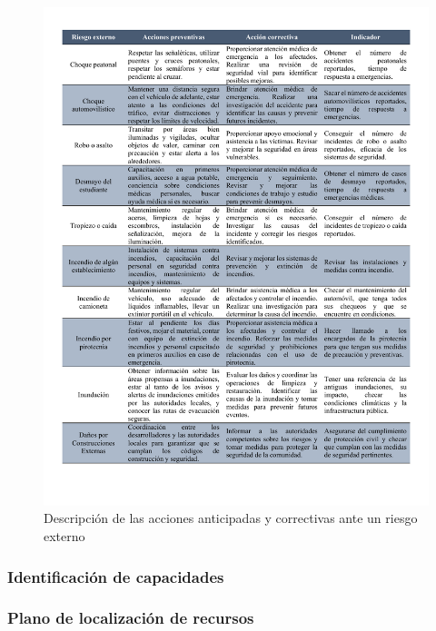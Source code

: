     \begin{figure}[H]
        \centering
        \includegraphics[trim = {10mm 20mm 10mm 10mm},clip,scale=0.41]{22/Img/riesgosExternos2.pdf}
        \caption{Descripción de las acciones anticipadas y correctivas ante un riesgo externo}
        \label{fig:accionAnti}
    \end{figure}
    
    
    
    
    \subsubsection{Identificación de capacidades}
    
    
    
    \subsubsection{Plano de localización de recursos}
    
    
